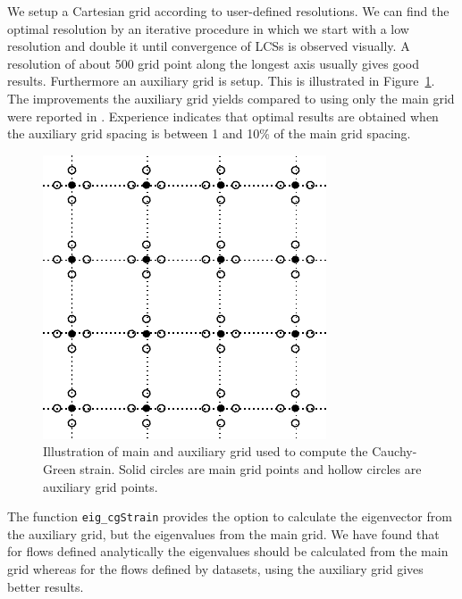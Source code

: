 \documentclass{article}
\begin{document}
We setup a Cartesian grid according to user-defined resolutions. We can find the optimal resolution by an iterative procedure in which we start with a low resolution and double it until convergence of LCSs is observed visually. A resolution of about 500 grid point along the longest axis usually gives good results. Furthermore an auxiliary grid is setup. This is illustrated in Figure~\ref{f:main and auxiliary grids}. The improvements the auxiliary grid yields compared to using only the main grid were reported in \textcite{farazmand12:_comput_lagran}. Experience indicates that optimal results are obtained when the auxiliary grid spacing is between 1 and 10\% of the main grid spacing.

\begin{figure}
\begin{center}
\includegraphics[width=\textwidth]{graphics/main_aux_grids}
\end{center}
\caption{Illustration of main and auxiliary grid used to compute the Cauchy-Green strain. Solid circles are main grid points and hollow circles are auxiliary grid points.}
\label{f:main and auxiliary grids}
\end{figure}

The function \texttt{eig\_cgStrain} provides the option to calculate the eigenvector from the auxiliary grid, but the eigenvalues from the main grid. We have found that for flows defined analytically the eigenvalues should be calculated from the main grid whereas for the flows defined by datasets, using the auxiliary grid gives better results.
\end{document}
